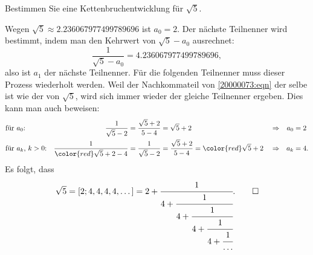 Bestimmen Sie eine Kettenbruchentwicklung für $\!\sqrt{5}$.

\begin{loesung}
Wegen $\!\sqrt{5} \approx 2.236067977499789696$ ist $a_0=2$.
Der nächste Teilnenner wird bestimmt, indem man den Kehrwert von
$\!\sqrt{5}-a_0$ ausrechnet:
\begin{equation}
\frac{1}{\!\sqrt{5}-a_0} = 4.236067977499789696,
\label{20000073:eqn}
\end{equation}
also ist $a_1$ der nächste Teilnenner.
Für die folgenden Teilnenner muss dieser Prozess wiederholt werden.
Weil der Nachkommateil von \eqref{20000073:eqn} der selbe ist wie
der von $\!\sqrt{5}$, wird sich immer wieder der gleiche Teilnenner
ergeben.
Dies kann man auch beweisen:
\begin{align*}
&\text{für $a_0$:}&
\frac{1}{\sqrt{5}-2}
&=
\frac{\sqrt{5}+2}{5-4}
=
\sqrt{5}+2
&&\Rightarrow& a_0&=2
\\
&\text{für $a_k$, $k>0$:}&
\frac{1}{{\color{red}\sqrt{5}+2}-4}
&=
\frac{1}{\sqrt{5}-2}
=
\frac{\sqrt{5}+2}{5-4}
=
{\color{red}\sqrt{5}+2}
&&\Rightarrow& a_k&=4.
\end{align*}
Es folgt, dass
\[
\sqrt{5}
=
[2;4,4,4,4,\dots]
=
2 + \cfrac{1}{4+\cfrac{1}{4 + \cfrac{1}{4+\cfrac{1}{4+\cfrac{1}{\dots}}}}}
.
\qedhere
\]
\end{loesung}

